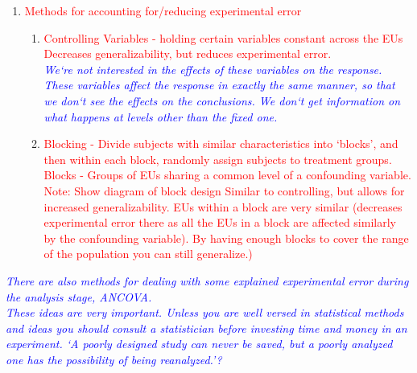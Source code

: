 \begin{enumerate}
		\item \textcolor{red}{Methods for accounting for/reducing experimental error }
		\begin{enumerate}
			\item \textcolor{red}{Controlling Variables - holding certain variables constant across the EUs\\
			Decreases generalizability, but reduces experimental error.}\\
\noindent\textit{\textcolor{blue}{We`re not interested in the effects of these variables on the response.  These variables affect the response in exactly the same manner, so that we	don`t see the effects on the conclusions. We don`t get information on what happens at levels other than the fixed one.}}
		\item \textcolor{red}{Blocking - Divide subjects with similar characteristics into `blocks', and then within each block, randomly assign subjects to treatment groups.\\
			Blocks - Groups of EUs sharing a common level of a confounding variable.\\
Note: Show diagram of block design		
			Similar to controlling, but allows for increased generalizability.  EUs within a block are very similar (decreases experimental error there as all the EUs in a block are affected similarly by the confounding variable).  By having enough blocks to cover the range of the population you can still generalize.)}
		\end{enumerate}
	\end{enumerate}
		\noindent\textit{\textcolor{blue}{There are also methods for dealing with some explained experimental error during the analysis stage, ANCOVA.\\
		These ideas are very important.  Unless you are well versed in statistical methods and ideas you should consult a statistician before investing time and money in an experiment.
`A poorly designed study can never be saved, but a poorly analyzed one has the possibility of being reanalyzed.'?}}
